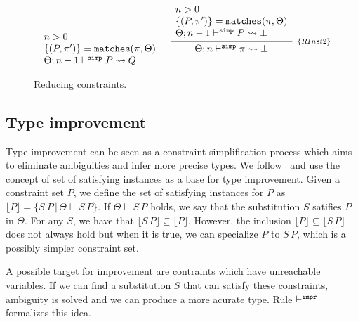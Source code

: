 \documentclass[a4paper, 11pt]{article}
\begin{document}
\begin{figure}[H]
\[\begin{array}{cc}
{\begin{array}{l}
              n > 0 \\ 
              \{(P,\pi')\} = \mathtt{matches}(\pi,\Theta)\\
              \Theta;n - 1 \simp P \leadsto Q
             \end{array}}
      &
      \infer[_{\{RInst2\}}]
            {\Theta ; n \simp \pi \leadsto \bot}
            {\begin{array}{l}
              n > 0 \\ 
              \{(P,\pi')\} = \mathtt{matches}(\pi,\Theta)\\
              \Theta;n - 1 \simp P \leadsto \bot
             \end{array}}

    \end{array}
  \]
  \centering
  \caption{Reducing constraints.}
  \label{fig:reduce-constraints}
\end{figure}

\subsection{Type improvement}

Type improvement can be seen as a constraint simplification 
process which aims to eliminate ambiguities and infer more 
precise types. We follow~\cite{Jones1995} and use the concept 
of set of satisfying instances as a base for type improvement.
Given a constraint set $P$, we define the set of satisfying
instances for $P$ as $\lfloor P \rfloor = \{S\:P\,|\,\Theta\Vdash S\,P\}$. 
If $\Theta\Vdash S\,P$ holds, we say that the substitution $S$ 
satifies $P$ in $\Theta$. For any $S$, we have that 
$\lfloor S\,P\rfloor \subseteq\lfloor P \rfloor$. However, the 
inclusion $\lfloor P \rfloor \subseteq \lfloor S\,P\rfloor$ does not 
always hold but when it is true, we can  specialize 
$P$ to $S\,P$, which is a possibly simpler constraint set.

A possible target for improvement are contraints which 
have unreachable variables. If we can find a substitution 
$S$ that can satisfy these constraints, ambiguity is solved 
and we can produce a more acurate type. Rule $\vdash^{\mathtt{impr}}$ formalizes 
this idea.
\end{document}
